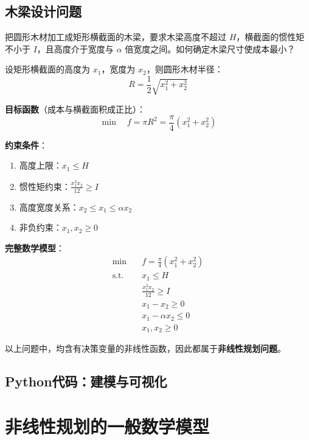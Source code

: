 \subsection{木梁设计问题}

\begin{conceptbox}[问题描述]
把圆形木材加工成矩形横截面的木梁，要求木梁高度不超过 $H$，横截面的惯性矩不小于 $I$，且高度介于宽度与 $\alpha$ 倍宽度之间。如何确定木梁尺寸使成本最小？
\end{conceptbox}

设矩形横截面的高度为 $x_1$，宽度为 $x_2$，则圆形木材半径：
\[
R = \frac{1}{2}\sqrt{x_1^2 + x_2^2}
\]

\textbf{目标函数}（成本与横截面积成正比）：
\[
\min\quad f = \pi R^2 = \frac{\pi}{4}(x_1^2 + x_2^2)
\]

\textbf{约束条件}：
\begin{enumerate}[label=(\arabic*)]
    \item 高度上限：$x_1 \leq H$
    \item 惯性矩约束：$\frac{x_1^3 x_2}{12} \geq I$
    \item 高度宽度关系：$x_2 \leq x_1 \leq \alpha x_2$
    \item 非负约束：$x_1, x_2 \geq 0$
\end{enumerate}

\textbf{完整数学模型}：
\[
\begin{aligned}
\min\quad & f = \frac{\pi}{4}(x_1^2 + x_2^2) \\
\text{s.t.}\quad & x_1 \leq H \\
& \frac{x_1^3 x_2}{12} \geq I \\
& x_1 - x_2 \geq 0 \\
& x_1 - \alpha x_2 \leq 0 \\
& x_1, x_2 \geq 0
\end{aligned}
\]

\begin{notebox}[关键观察]
以上问题中，均含有决策变量的非线性函数，因此都属于\textbf{非线性规划问题}。
\end{notebox}

\subsection{Python代码：建模与可视化}

\section{非线性规划的一般数学模型}\label{sec:general-model}

